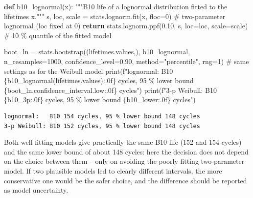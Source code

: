 \documentclass[
  letterpaper,
  DIV=11,
  numbers=noendperiod]{scrreprt}
\newenvironment{Shaded}{\begin{snugshade}}{\end{snugshade}}
\newcommand{\BuiltInTok}[1]{\textcolor[rgb]{0.00,0.23,0.31}{#1}}
\newcommand{\CommentTok}[1]{\textcolor[rgb]{0.37,0.37,0.37}{#1}}
\newcommand{\ControlFlowTok}[1]{\textcolor[rgb]{0.00,0.23,0.31}{\textbf{#1}}}
\newcommand{\DecValTok}[1]{\textcolor[rgb]{0.68,0.00,0.00}{#1}}
\newcommand{\FloatTok}[1]{\textcolor[rgb]{0.68,0.00,0.00}{#1}}
\newcommand{\KeywordTok}[1]{\textcolor[rgb]{0.00,0.23,0.31}{\textbf{#1}}}
\newcommand{\NormalTok}[1]{\textcolor[rgb]{0.00,0.23,0.31}{#1}}
\newcommand{\OperatorTok}[1]{\textcolor[rgb]{0.37,0.37,0.37}{#1}}
\newcommand{\SpecialCharTok}[1]{\textcolor[rgb]{0.37,0.37,0.37}{#1}}
\newcommand{\SpecialStringTok}[1]{\textcolor[rgb]{0.13,0.47,0.30}{#1}}
\newcommand{\StringTok}[1]{\textcolor[rgb]{0.13,0.47,0.30}{#1}}
\begin{document}
\begin{tcolorbox}[enhanced jigsaw, left=2mm, title=\textcolor{quarto-callout-caution-color}{\faFire}\hspace{0.5em}{Solution to Exercise 1}, opacityback=0, breakable, rightrule=.15mm, arc=.35mm, toptitle=1mm, colbacktitle=quarto-callout-caution-color!10!white, opacitybacktitle=0.6, coltitle=black, colframe=quarto-callout-caution-color-frame, bottomrule=.15mm, leftrule=.75mm, bottomtitle=1mm, titlerule=0mm, toprule=.15mm, colback=white]

\begin{Shaded}
\begin{Highlighting}[]
\KeywordTok{def}\NormalTok{ b10\_lognormal(x):}
    \CommentTok{"""B10 life of a lognormal distribution fitted to the lifetimes x."""}
\NormalTok{    s, loc, scale }\OperatorTok{=}\NormalTok{ stats.lognorm.fit(x, floc}\OperatorTok{=}\DecValTok{0}\NormalTok{)                 }\CommentTok{\# two{-}parameter lognormal (loc fixed at 0)}
    \ControlFlowTok{return}\NormalTok{ stats.lognorm.ppf(}\FloatTok{0.10}\NormalTok{, s, loc}\OperatorTok{=}\NormalTok{loc, scale}\OperatorTok{=}\NormalTok{scale)      }\CommentTok{\# 10 \% quantile of the fitted model}

\NormalTok{boot\_ln }\OperatorTok{=}\NormalTok{ stats.bootstrap((lifetimes.values,), b10\_lognormal, n\_resamples}\OperatorTok{=}\DecValTok{1000}\NormalTok{, confidence\_level}\OperatorTok{=}\FloatTok{0.90}\NormalTok{,}
\NormalTok{                          method}\OperatorTok{=}\StringTok{"percentile"}\NormalTok{, rng}\OperatorTok{=}\DecValTok{1}\NormalTok{)            }\CommentTok{\# same settings as for the Weibull model}
\BuiltInTok{print}\NormalTok{(}\SpecialStringTok{f"lognormal:   B10 }\SpecialCharTok{\{}\NormalTok{b10\_lognormal(lifetimes.values)}\SpecialCharTok{:.0f\}}\SpecialStringTok{ cycles, 95 \% lower bound }\SpecialCharTok{\{}\NormalTok{boot\_ln}\SpecialCharTok{.}\NormalTok{confidence\_interval}\SpecialCharTok{.}\NormalTok{low}\SpecialCharTok{:.0f\}}\SpecialStringTok{ cycles"}\NormalTok{)}
\BuiltInTok{print}\NormalTok{(}\SpecialStringTok{f"3{-}p Weibull: B10 }\SpecialCharTok{\{}\NormalTok{b10\_3p}\SpecialCharTok{:.0f\}}\SpecialStringTok{ cycles, 95 \% lower bound }\SpecialCharTok{\{}\NormalTok{b10\_lower}\SpecialCharTok{:.0f\}}\SpecialStringTok{ cycles"}\NormalTok{)}
\end{Highlighting}
\end{Shaded}

\begin{verbatim}
lognormal:   B10 154 cycles, 95 % lower bound 148 cycles
3-p Weibull: B10 152 cycles, 95 % lower bound 148 cycles
\end{verbatim}

Both well-fitting models give practically the same B10 life (152 and 154
cycles) and the same lower bound of about 148 cycles: here the decision
does not depend on the choice between them -- only on avoiding the
poorly fitting two-parameter model. If two plausible models led to
clearly different intervals, the more conservative one would be the
safer choice, and the difference should be reported as model
uncertainty.

\end{tcolorbox}
\end{document}
